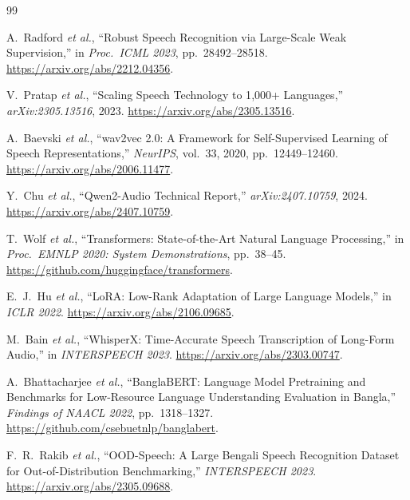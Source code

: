 \documentclass[12pt,a4paper]{article}
\begin{document}
\begin{thebibliography}{99}

A.~Radford \emph{et al.},
``Robust Speech Recognition via Large-Scale Weak Supervision,''
in \emph{Proc.\ ICML 2023}, pp.~28492--28518.
\url{https://arxiv.org/abs/2212.04356}.

V.~Pratap \emph{et al.},
``Scaling Speech Technology to 1{,}000+ Languages,''
\emph{arXiv:2305.13516}, 2023.
\url{https://arxiv.org/abs/2305.13516}.

A.~Baevski \emph{et al.},
``wav2vec 2.0: A Framework for Self-Supervised Learning of Speech
Representations,''
\emph{NeurIPS}, vol.~33, 2020, pp.~12449--12460.
\url{https://arxiv.org/abs/2006.11477}.

Y.~Chu \emph{et al.},
``Qwen2-Audio Technical Report,''
\emph{arXiv:2407.10759}, 2024.
\url{https://arxiv.org/abs/2407.10759}.

T.~Wolf \emph{et al.},
``Transformers: State-of-the-Art Natural Language Processing,''
in \emph{Proc.\ EMNLP 2020: System Demonstrations}, pp.~38--45.
\url{https://github.com/huggingface/transformers}.

E.~J.~Hu \emph{et al.},
``LoRA: Low-Rank Adaptation of Large Language Models,''
in \emph{ICLR 2022}.
\url{https://arxiv.org/abs/2106.09685}.

M.~Bain \emph{et al.},
``WhisperX: Time-Accurate Speech Transcription of Long-Form Audio,''
in \emph{INTERSPEECH 2023}.
\url{https://arxiv.org/abs/2303.00747}.

A.~Bhattacharjee \emph{et al.},
``BanglaBERT: Language Model Pretraining and Benchmarks for
Low-Resource Language Understanding Evaluation in Bangla,''
\emph{Findings of NAACL 2022}, pp.~1318--1327.
\url{https://github.com/csebuetnlp/banglabert}.

F.~R.~Rakib \emph{et al.},
``OOD-Speech: A Large Bengali Speech Recognition Dataset for
Out-of-Distribution Benchmarking,''
\emph{INTERSPEECH 2023}.
\url{https://arxiv.org/abs/2305.09688}.

\end{thebibliography}
\end{document}
